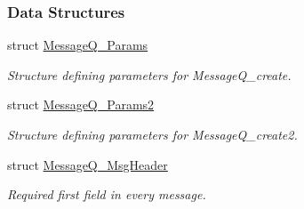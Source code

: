 \subsubsection*{Data Structures}
\begin{DoxyCompactItemize}
\item 
struct \hyperlink{struct_message_q___params}{Message\-Q\-\_\-\-Params}
\begin{DoxyCompactList}\small\item\em Structure defining parameters for Message\-Q\-\_\-create. \end{DoxyCompactList}\item 
struct \hyperlink{struct_message_q___params2}{Message\-Q\-\_\-\-Params2}
\begin{DoxyCompactList}\small\item\em Structure defining parameters for Message\-Q\-\_\-create2. \end{DoxyCompactList}\item 
struct \hyperlink{struct_message_q___msg_header}{Message\-Q\-\_\-\-Msg\-Header}
\begin{DoxyCompactList}\small\item\em Required first field in every message. \end{DoxyCompactList}\end{DoxyCompactItemize}
